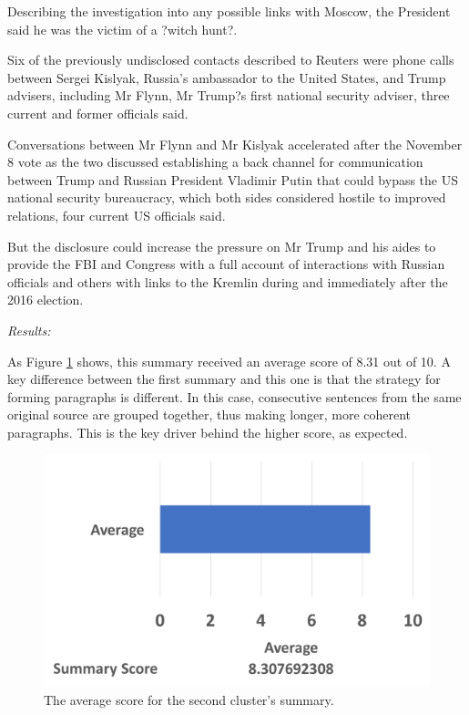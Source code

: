 \documentclass[12pt]{article}
\begin{document}
\begin{mdframed}
Describing the investigation into any possible links with Moscow, the President said he was the victim of a ?witch hunt?.

Six of the previously undisclosed contacts described to Reuters were phone calls between Sergei Kislyak, Russia's ambassador to the United States, and Trump advisers, including Mr Flynn, Mr Trump?s first national security adviser, three current and former officials said.

Conversations between Mr Flynn and Mr Kislyak accelerated after the November 8 vote as the two discussed establishing a back channel for communication between Trump and Russian President Vladimir Putin that could bypass the US national security bureaucracy, which both sides considered hostile to improved relations, four current US officials said.

But the disclosure could increase the pressure on Mr Trump and his aides to provide the FBI and Congress with a full account of interactions with Russian officials and others with links to the Kremlin during and immediately after the 2016 election. \\

\end{mdframed}

\emph{Results:}

As Figure \ref{summ2} shows, this summary received an average score of 8.31 out of 10. A key difference between the first summary and this one is that the strategy for forming paragraphs is different. In this case, consecutive sentences from the same original source are grouped together, thus making longer, more coherent paragraphs. This is the key driver behind the higher score, as expected. \\

\begin{figure}[ht!]
  \centering
    \includegraphics[scale=0.6]{summ2score.png}
   \caption[The average score for a summary]{The average score for the second cluster's summary.}
   \label{summ2}
\end{figure} 
\end{document}
